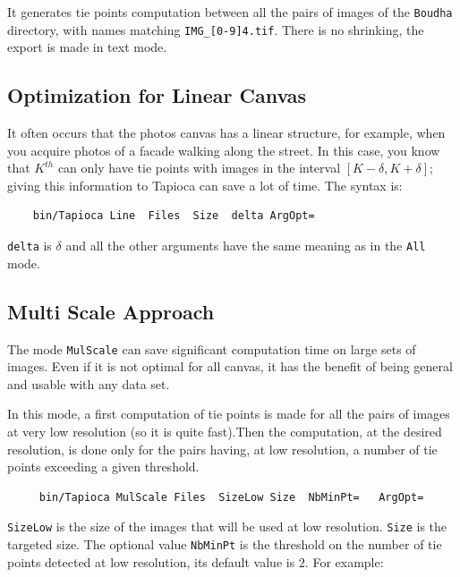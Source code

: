 It generates tie points computation between all the pairs of images of the {\tt Boudha} directory,
with names matching {\tt IMG\_[0-9]{4}.tif}. There is no shrinking, the export is
made in text mode.


\subsection{Optimization for Linear Canvas}

It often occurs that the photos canvas  has a linear structure, for example, when you acquire
photos of a facade walking  along the street.   In this case, you
know that $K^{th}$  can only have tie points
with images in the interval $[K-\delta,K+\delta]$; giving this information
to Tapioca can save a lot of time. The syntax is:

{\scriptsize
\begin{verbatim}
    bin/Tapioca Line  Files  Size  delta ArgOpt=
\end{verbatim}
}

{\tt delta} is $\delta$ and all the other arguments have the same meaning as in the
 {\tt All} mode.


\subsection{Multi Scale Approach}


The mode  {\tt MulScale} can save  significant computation time on large sets of images.
Even if it is not optimal for all canvas, it has the benefit of being general
and usable with any data set.

In this mode, a first computation of tie points is made for all the pairs 
of images at very low resolution (so it is quite fast).Then the 
computation, at the desired resolution, is done  only for the pairs
having, at low resolution, a number  of tie points exceeding a given
threshold.



{\scriptsize
\begin{verbatim}
     bin/Tapioca MulScale Files  SizeLow Size  NbMinPt=   ArgOpt=
\end{verbatim}
}
 
{\tt SizeLow} is the size of the images that will be used at low resolution.
{\tt Size} is the targeted size.  The optional value {\tt NbMinPt}
is the threshold on the number of tie points detected at low resolution,
its default value is $2$. For example:

